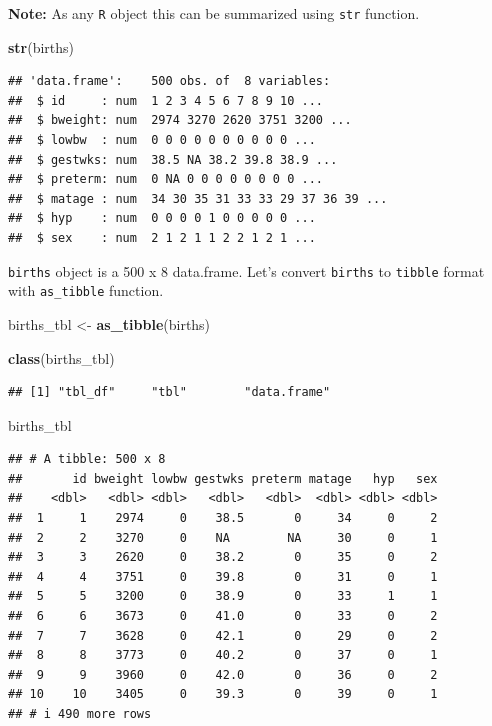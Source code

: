 \documentclass[
]{book}
\newenvironment{Shaded}{\begin{snugshade}}{\end{snugshade}}
\newcommand{\FunctionTok}[1]{\textcolor[rgb]{0.13,0.29,0.53}{\textbf{#1}}}
\newcommand{\NormalTok}[1]{#1}
\newcommand{\OtherTok}[1]{\textcolor[rgb]{0.56,0.35,0.01}{#1}}
\begin{document}
\textbf{Note:} As any \texttt{R} object this can be summarized using \texttt{str} function.

\begin{Shaded}
\begin{Highlighting}[]
\FunctionTok{str}\NormalTok{(births)}
\end{Highlighting}
\end{Shaded}

\begin{verbatim}
## 'data.frame':    500 obs. of  8 variables:
##  $ id     : num  1 2 3 4 5 6 7 8 9 10 ...
##  $ bweight: num  2974 3270 2620 3751 3200 ...
##  $ lowbw  : num  0 0 0 0 0 0 0 0 0 0 ...
##  $ gestwks: num  38.5 NA 38.2 39.8 38.9 ...
##  $ preterm: num  0 NA 0 0 0 0 0 0 0 0 ...
##  $ matage : num  34 30 35 31 33 33 29 37 36 39 ...
##  $ hyp    : num  0 0 0 0 1 0 0 0 0 0 ...
##  $ sex    : num  2 1 2 1 1 2 2 1 2 1 ...
\end{verbatim}

\texttt{births} object is a 500 x 8 data.frame.
Let's convert \texttt{births} to \texttt{tibble} format with \texttt{as\_tibble} function.

\begin{Shaded}
\begin{Highlighting}[]
\NormalTok{births\_tbl }\OtherTok{\textless{}{-}} \FunctionTok{as\_tibble}\NormalTok{(births)}

\FunctionTok{class}\NormalTok{(births\_tbl)}
\end{Highlighting}
\end{Shaded}

\begin{verbatim}
## [1] "tbl_df"     "tbl"        "data.frame"
\end{verbatim}

\begin{Shaded}
\begin{Highlighting}[]
\NormalTok{births\_tbl}
\end{Highlighting}
\end{Shaded}

\begin{verbatim}
## # A tibble: 500 x 8
##       id bweight lowbw gestwks preterm matage   hyp   sex
##    <dbl>   <dbl> <dbl>   <dbl>   <dbl>  <dbl> <dbl> <dbl>
##  1     1    2974     0    38.5       0     34     0     2
##  2     2    3270     0    NA        NA     30     0     1
##  3     3    2620     0    38.2       0     35     0     2
##  4     4    3751     0    39.8       0     31     0     1
##  5     5    3200     0    38.9       0     33     1     1
##  6     6    3673     0    41.0       0     33     0     2
##  7     7    3628     0    42.1       0     29     0     2
##  8     8    3773     0    40.2       0     37     0     1
##  9     9    3960     0    42.0       0     36     0     2
## 10    10    3405     0    39.3       0     39     0     1
## # i 490 more rows
\end{verbatim}
\end{document}
